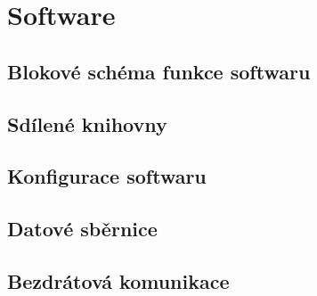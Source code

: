 \chapter{Software}

\section{Blokové schéma funkce softwaru}

\section{Sdílené knihovny}

\section{Konfigurace softwaru}

\section{Datové sběrnice}

\section{Bezdrátová komunikace}

\newpage